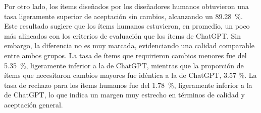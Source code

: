Por otro lado, los ítems diseñados por los diseñadores humanos
obtuvieron una tasa ligeramente superior de aceptación sin cambios,
alcanzando un 89.28~\%. Este resultado sugiere que los ítems humanos
estuvieron, en promedio, un poco más alineados con los criterios de
evaluación que los ítems de ChatGPT. Sin embargo, la diferencia no es
muy marcada, evidenciando una calidad comparable entre ambos grupos. La
tasa de ítems que requirieron cambios menores fue del 5.35~\%,
ligeramente inferior a la de ChatGPT, mientras que la proporción de
ítems que necesitaron cambios mayores fue idéntica a la de ChatGPT, 3.57
\%. La tasa de rechazo para los ítems humanos fue del 1.78~\%,
ligeramente inferior a la de ChatGPT, lo que indica un margen muy
estrecho en términos de calidad y aceptación general.
